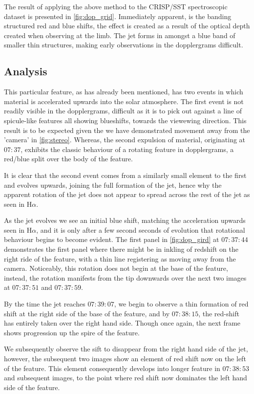 \documentclass{emulateapj}
\begin{document}
The result of applying the above method to the CRISP/SST spectroscopic dataset is presented in \cref{fig:dop_grid}.
Immediately apparent, is the banding structured red and blue shifts, the effect is created as a result of the optical depth created when observing at the limb. 
The jet forms in amongst a blue band of smaller thin structures, making early observations in the dopplergrams difficult.  

\subsection{Analysis}
This particular feature, as has already been mentioned, has two events in which material is accelerated upwards into the solar atmosphere.
The first event is not readily visible in the dopplergrams, difficult as it is to pick out against a line of spicule-like features all showing blueshifts, towards the viewewing direction.
This result is to be expected given the we have demonstrated movement away from the 'camera' in \cref{fig:stereo}.
Whereas, the second expulsion of material, originating at $07:37$, exhibits the classic behaviour of a rotating feature in dopplergrams, a red/blue split over the body of the feature. 
 
It is clear that the second event comes from a similarly small element to the first and evolves upwards, joining the full formation of the jet, hence why the apparent rotation of the jet does not appear to spread across the rest of the jet as seen in H$\alpha$.

As the jet evolves we see an initial blue shift, matching the acceleration upwards seen in H$\alpha$, and it is only after a few second seconds of evolution that rotational behaviour begins to become evident.
The first panel in \cref{fig:dop_gird} at $07:37:44$ demonstrates the first panel where there might be in inkling of redshift on the right ride of the feature, with a thin line registering as moving away from the camera.
Noticeably, this rotation does not begin at the base of the feature, instead, the rotation manifests from the tip downwards over the next two images at $07:37:51$ and $07:37:59$.

By the time the jet reaches $07:39:07$, we begin to observe a thin formation of red shift at the right side of the base of the feature, and by $07:38:15$, the red-shift has entirely taken over the right hand side.
Though once again, the next frame shows progression up the spire of the feature.

We subsequently observe the sift to disappear from the right hand side of the jet, however, the subsequent two images show an element of red shift now on the left of the feature.
This element consequently develops into longer feature in $07:38:53$ and subsequent images, to the point where red shift now dominates the left hand side of the feature.
\end{document}
